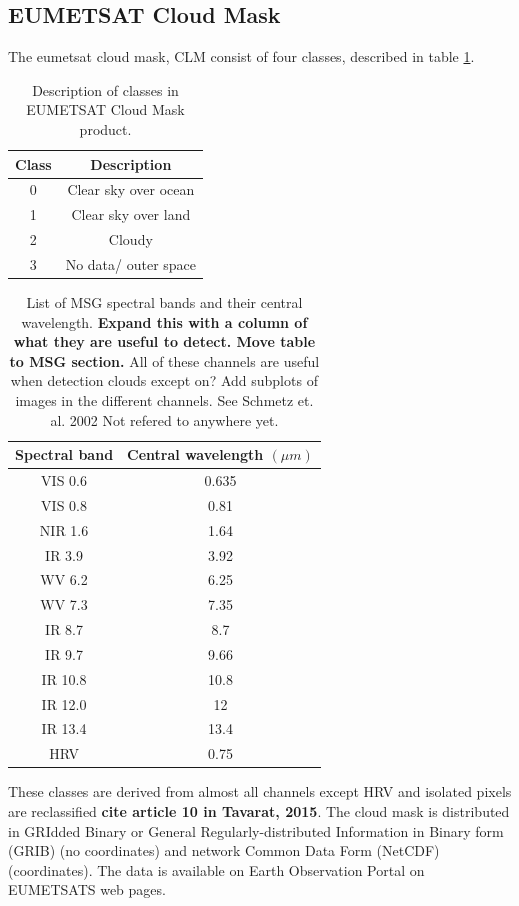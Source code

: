 \subsection{EUMETSAT Cloud Mask} \label{sec:EUMETSAT_cloud_mask}

The \acrshort{eumetsat} cloud mask, CLM consist of four classes, described in table \ref{tab:classes_clm}.

\begin{table}[]
    \centering
    \begin{tabular}{c|c}
        Class & Description \\ \hline
        0 & Clear sky over ocean \\
        1 & Clear sky over land \\
        2 & Cloudy \\
        3 & No data/ outer space        
    \end{tabular}
    \caption{Description of classes in EUMETSAT Cloud Mask product.}
    \label{tab:classes_clm}
\end{table}

\begin{table}[]
    \centering
    \begin{tabular}{c|c}
        Spectral band & Central wavelength $\left( \mu m  \right)$ \\ \hline
        VIS 0.6 & 0.635 \\
        VIS 0.8 & 0.81 \\
        NIR 1.6 & 1.64 \\
        IR 3.9 & 3.92 \\
        WV 6.2 & 6.25 \\
        WV 7.3 & 7.35 \\ 
        IR 8.7 & 8.7 \\
        IR 9.7 & 9.66 \\
        IR 10.8 & 10.8 \\
        IR 12.0 & 12 \\
        IR 13.4 & 13.4 \\
        HRV & 0.75
    \end{tabular}
    \caption{List of MSG spectral bands and their central wavelength. \textbf{Expand this with a column of what they are useful to detect. Move table to MSG section. } All of these channels are useful when detection clouds except on? Add subplots of images in the different channels. See Schmetz et. al. 2002  Not refered to anywhere yet.}
    \label{tab:msg_spectral_bands}
\end{table}
These classes are derived from almost all channels except HRV and isolated pixels are reclassified \textbf{cite article 10 in Tavarat, 2015}. The cloud mask is distributed in GRIdded Binary or General Regularly-distributed Information in Binary form (GRIB) (no coordinates) and network Common Data Form (NetCDF) (coordinates). The data is available on Earth Observation Portal on EUMETSATS web pages. 
\\ \\ 



